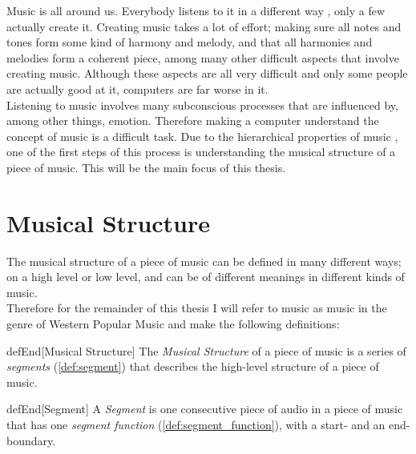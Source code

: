 Music is all around us. Everybody listens to it in a different way \cite{Cox2012a}, only a few actually create it. Creating music takes a lot of effort; making sure all notes and tones form some kind of harmony and melody, and that all harmonies and melodies form a coherent piece, among many other difficult aspects that involve creating music. Although these aspects are all very difficult and only some people are actually good at it, computers are far worse in it.\\
Listening to music involves many subconscious processes that are influenced by, among other things, emotion. Therefore making a computer understand the concept of music is a difficult task.
Due to the hierarchical properties of music \cite{Cooper1960rhythmic, Lerdahl1983overview}, one of the first steps of this process is understanding the musical structure of a piece of music. This will be the main focus of this thesis.


\section{Musical Structure}
The musical structure of a piece of music can be defined in many different ways; on a high level or low level, and can be of different meanings in different kinds of music.\\
Therefore for the remainder of this thesis I will refer to music as music in the genre of Western Popular Music \cite{Serra2012measuring} and make the following definitions:

\theoremstyle{definition}
\begin{theoremEnd}[restate,category=def]{defEnd}[Musical Structure]
    \label{def:musical_structure}
    The \textit{Musical Structure} of a piece of music is a series of \textit{segments} (\ref{def:segment}) that describes the high-level structure of a piece of music.
\end{theoremEnd}

\begin{theoremEnd}[restate,category=def]{defEnd}[Segment]
    \label{def:segment}
    A \textit{Segment} is one consecutive piece of audio in a piece of music that has one \textit{segment function} (\ref{def:segment_function}), with a start- and an end-boundary.
\end{theoremEnd}

